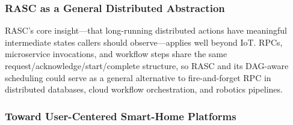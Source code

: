 \subsubsection{RASC as a General Distributed Abstraction}
\label{conc:sec:rasc-general}

RASC's core insight---that long-running distributed actions have meaningful intermediate states callers should observe---applies well beyond IoT. RPCs, microservice invocations, and workflow steps share the same request/acknowledge/start/complete structure, so RASC and its DAG-aware scheduling could serve as a general alternative to fire-and-forget RPC in distributed databases, cloud workflow orchestration, and robotics pipelines.


\subsubsection{Toward User-Centered Smart-Home Platforms}
\label{conc:sec:user-platforms}

